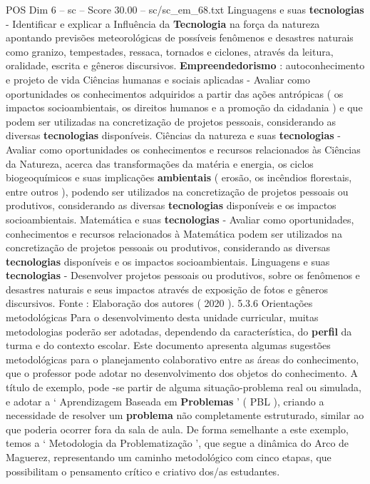 \begin{textsample}{POS Dim 6 – sc – Score 30.00 – sc/sc\_em\_68.txt}
Linguagens e suas \textbf{tecnologias} - Identificar e explicar a Influência da \textbf{Tecnologia} na força da natureza apontando previsões meteorológicas de possíveis fenômenos e desastres naturais como granizo, tempestades, ressaca, tornados e ciclones, através da leitura, oralidade, escrita e gêneros discursivos. \textbf{Empreendedorismo} : autoconhecimento e projeto de vida Ciências humanas e sociais aplicadas - Avaliar como oportunidades os conhecimentos adquiridos a partir das ações antrópicas ( os impactos socioambientais, os direitos humanos e a promoção da cidadania ) e que podem ser utilizadas na concretização de projetos pessoais, considerando as diversas \textbf{tecnologias} disponíveis.
Ciências da natureza e suas \textbf{tecnologias} - Avaliar como oportunidades os conhecimentos e recursos relacionados às Ciências da Natureza, acerca das transformações da matéria e energia, os ciclos biogeoquímicos e suas implicações \textbf{ambientais} ( erosão, os incêndios florestais, entre outros ), podendo ser utilizados na concretização de projetos pessoais ou produtivos, considerando as diversas \textbf{tecnologias} disponíveis e os impactos socioambientais.
Matemática e suas \textbf{tecnologias} - Avaliar como oportunidades, conhecimentos e recursos relacionados à Matemática podem ser utilizados na concretização de projetos pessoais ou produtivos, considerando as diversas \textbf{tecnologias} disponíveis e os impactos socioambientais.
Linguagens e suas \textbf{tecnologias} - Desenvolver projetos pessoais ou produtivos, sobre os fenômenos e desastres naturais e seus impactos através de exposição de fotos e gêneros discursivos.
Fonte : Elaboração dos autores ( 2020 ). 5.3.6 Orientações metodológicas Para o desenvolvimento desta unidade curricular, muitas metodologias poderão ser adotadas, dependendo da característica, do \textbf{perfil} da turma e do contexto escolar.
Este documento apresenta algumas sugestões metodológicas para o planejamento colaborativo entre as áreas do conhecimento, que o professor pode adotar no desenvolvimento dos objetos do conhecimento.
A título de exemplo, pode -se partir de alguma situação-problema real ou simulada, e adotar a ‘ Aprendizagem Baseada em \textbf{Problemas} ’ ( PBL ), criando a necessidade de resolver um \textbf{problema} não completamente estruturado, similar ao que poderia ocorrer fora da sala de aula.
De forma semelhante a este exemplo, temos a ‘ Metodologia da Problematização ’, que segue a dinâmica do Arco de Maguerez, representando um caminho metodológico com cinco etapas, que possibilitam o pensamento crítico e criativo dos/as estudantes.

\end{textsample}
